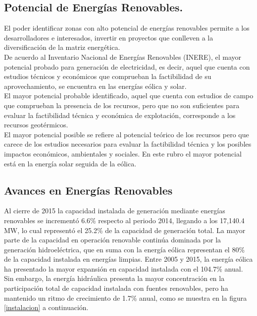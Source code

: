 \subsection{Potencial de Energías Renovables.}
El poder identificar zonas con alto potencial de energías renovables permite a los desarrolladores e interesados, invertir en proyectos que conlleven a la diversificación de la matriz energética.\\

De acuerdo al Inventario Nacional de Energías Renovables (INERE), el mayor potencial probado para generación de electricidad, es decir, aquel que cuenta con estudios técnicos y económicos que comprueban la factibilidad de su aprovechamiento, se encuentra en las energías eólica y solar.\\

El mayor potencial probable identificado, aquel que cuenta con estudios de campo que comprueban la presencia de los recursos, pero que no son suficientes para evaluar la factibilidad técnica y económica de explotación, corresponde a los recursos geotérmicos.\\

El mayor potencial posible se refiere al potencial teórico de los recursos pero que carece de los estudios necesarios para evaluar la factibilidad técnica y los posibles impactos económicos, ambientales y sociales. En este rubro el mayor potencial está en la energía solar seguida de la eólica.

\subsection{Avances en Energías Renovables}
Al cierre de 2015 la capacidad instalada de generación mediante energías renovables se incrementó 6.6\% respecto al periodo 2014, llegando a los 17,140.4 MW, lo cual representó el 25.2\% de la capacidad de generación total. La mayor parte de la capacidad en operación renovable continúa dominada por la generación hidroeléctrica, que en suma con la energía eólica representan el 80\% de la capacidad instalada en energías limpias. Entre 2005 y 2015, la energía eólica ha presentado la mayor expansión en capacidad instalada con el 104.7\% anual. Sin embargo, la energía hidráulica presenta la mayor concentración en la participación total de capacidad instalada con fuentes renovables, pero ha mantenido un ritmo de crecimiento de 1.7\% anual, como se muestra en la figura \ref{instalacion} a continuación.

